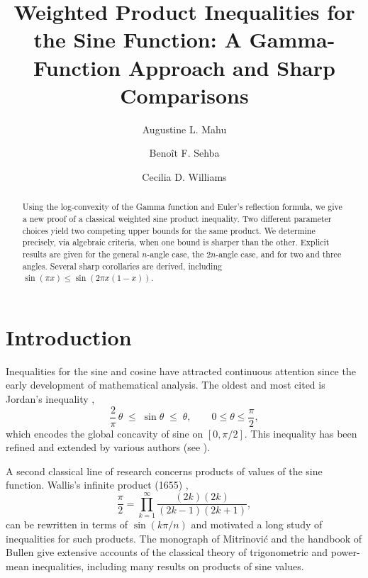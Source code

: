 \documentclass[12pt]{amsart}
\title[Weighted Product Inequalities for the Sine Function]{Weighted Product Inequalities for the Sine Function: A Gamma-Function Approach and Sharp Comparisons}
\author {Augustine L. Mahu}
\author {Beno\^it F. Sehba}
\author {Cecilia D. Williams}
\date{}
\theoremstyle{definition}
\begin{document}
\maketitle

\begin{abstract}
Using the log-convexity of the Gamma function and Euler's reflection formula, we give a new proof of a classical weighted sine product inequality. Two different parameter choices yield two competing upper bounds for the same product. We determine precisely, via algebraic criteria, when one bound is sharper than the other. Explicit results are given for the general $n$-angle case, the $2n$-angle case, and for two and three angles. Several sharp corollaries are derived, including $\sin(\pi x)\leq \sin(2\pi x(1-x))$.
\end{abstract}

\bigskip

\section{Introduction}


Inequalities for the sine and cosine have attracted continuous
attention since the early development of mathematical analysis.
The oldest and most cited is Jordan's inequality
\cite{Jordan1894},
\begin{equation}\label{eq:Jordan}
  \frac{2}{\pi}\,\theta \;\leq\; \sin\theta \;\leq\; \theta,
  \qquad 0\leq\theta\leq\frac\pi2,
\end{equation}
which encodes the global concavity of sine on $[0,\pi/2]$. This inequality has been refined and extended by various authors (see \cite{Qi2009,Zhu2006}). 

A second classical line of research concerns products of values
of the sine function.  Wallis's infinite product (1655)
\cite{Wallis1656},
\begin{equation}\label{eq:Wallis}
  \frac\pi2 = \prod_{k=1}^\infty\frac{(2k)(2k)}{(2k-1)(2k+1)},
\end{equation}
can be rewritten in terms of $\sin(k\pi/n)$ and motivated a
long study of inequalities for such products.
The monograph of Mitrinovi\'c \cite{Mitrinovic1970} and the handbook
of Bullen \cite{Bullen2003} give extensive accounts of the classical
theory of trigonometric and power-mean inequalities, including
many results on products of sine values.
\end{document}

